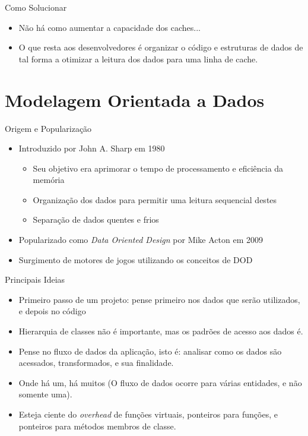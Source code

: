 \documentclass{beamer}
\begin{document}
\begin{frame}{Como Solucionar}
    \begin{itemize}
        \item Não há como aumentar a capacidade dos caches...
        \item O que resta aos desenvolvedores é organizar o código e estruturas de dados
              de tal forma a otimizar a leitura dos dados para uma linha de cache.
    \end{itemize}
\end{frame}

\section{Modelagem Orientada a Dados}

\frame{\tableofcontents[currentsection]}

\begin{frame}{Origem e Popularização}
    \begin{itemize}
        \item Introduzido por John A. Sharp em 1980
            \begin{itemize}
                \item Seu objetivo era aprimorar o tempo de processamento e eficiência da memória
                \item Organização dos dados para permitir uma leitura sequencial destes
                \item Separação de dados quentes e frios
            \end{itemize}
        \item Popularizado como \textit{Data Oriented Design} por Mike Acton em 2009
        \item Surgimento de motores de jogos utilizando os conceitos de DOD
    \end{itemize}
\end{frame}

\begin{frame}{Principais Ideias}
    \begin{itemize}
        \item Primeiro passo de um projeto: pense primeiro nos dados que serão utilizados, e depois no código
        \item Hierarquia de classes não é importante, mas os padrões de acesso aos dados é.
        \item Pense no fluxo de dados da aplicação, isto é: analisar como os dados são acessados, 
              transformados, e sua finalidade.
        \item Onde há um, há muitos (O fluxo de dados ocorre para várias entidades, e não somente uma).
        \item Esteja ciente do \textit{overhead} de funções virtuais, ponteiros para funções, e ponteiros para 
            métodos membros de classe.
    \end{itemize}
\end{frame}
\end{document}
